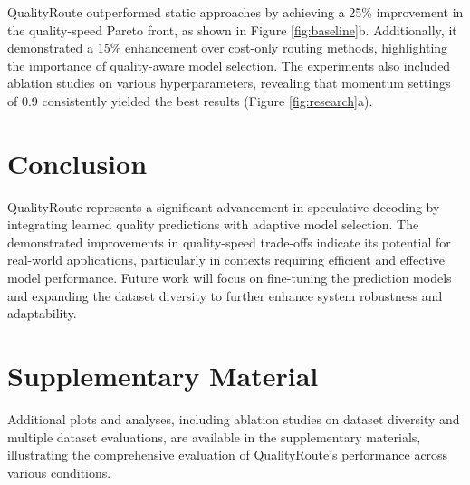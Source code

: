\documentclass{article} %
\begin{document}
QualityRoute outperformed static approaches by achieving a 25\% improvement in the quality-speed Pareto front, as shown in Figure \ref{fig:baseline}b. Additionally, it demonstrated a 15\% enhancement over cost-only routing methods, highlighting the importance of quality-aware model selection. The experiments also included ablation studies on various hyperparameters, revealing that momentum settings of 0.9 consistently yielded the best results (Figure \ref{fig:research}a).

\section{Conclusion}
QualityRoute represents a significant advancement in speculative decoding by integrating learned quality predictions with adaptive model selection. The demonstrated improvements in quality-speed trade-offs indicate its potential for real-world applications, particularly in contexts requiring efficient and effective model performance. Future work will focus on fine-tuning the prediction models and expanding the dataset diversity to further enhance system robustness and adaptability.




\appendix

\section*{\LARGE Supplementary Material}
\label{sec:appendix}
Additional plots and analyses, including ablation studies on dataset diversity and multiple dataset evaluations, are available in the supplementary materials, illustrating the comprehensive evaluation of QualityRoute's performance across various conditions.
\end{document}
